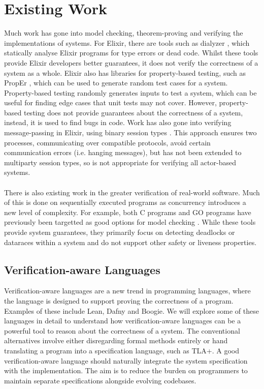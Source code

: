 \section{Existing Work} \label{sec:existing_work}
Much work has gone into model checking, theorem-proving and verifying the implementations of systems. For Elixir, there are tools such as dialyzer \cite{dialyzer}, which statically analyse Elixir programs for type errors or dead code. Whilst these tools provide Elixir developers better guarantees, it does not verify the correctness of a system as a whole. Elixir also has libraries for property-based testing, such as PropEr \cite{proper}, which can be used to generate random test cases for a system. Property-based testing randomly generates inputs to test a system, which can be useful for finding edge cases that unit tests may not cover. However, property-based testing does not provide guarantees about the correctness of a system, instead, it is used to find bugs in code. Work has also gone into verifying message-passing in Elixir, using binary session types \cite{binary_session_types}. This approach ensures two processes, communicating over compatible protocols, avoid certain communication errors (i.e. hanging messages), but has not been extended to multiparty session types, so is not appropriate for verifying all actor-based systems.
\\ \\
There is also existing work in the greater verification of real-world software. Much of this is done on sequentially executed programs as concurrency introduces a new level of complexity. For example, both C programs and GO programs have previously been targetted as good options for model checking \cite{gomela, c_to_promela}. While these tools provide system guarantees, they primarily focus on detecting deadlocks or dataraces within a system and do not support other safety or liveness properties.  
\subsection{Verification-aware Languages}
Verification-aware languages are a new trend in programming languages, where the language is designed to support proving the correctness of a program. Examples of these include Lean, Dafny and Boogie. We will explore some of these languages in detail to understand how verification-aware languages can be a powerful tool to reason about the correctness of a system. The conventional alternatives involve either disregarding formal methods entirely or hand translating a program into a specification language, such as TLA+. A good verification-aware language should naturally integrate the system specification with the implementation. The aim is to reduce the burden on programmers to maintain separate specifications alongside evolving codebases.
